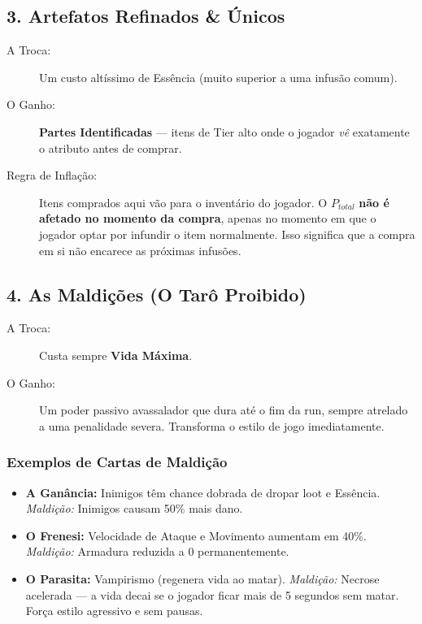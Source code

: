 \documentclass[a4paper,12pt]{report}
\begin{document}
\subsection{3. Artefatos Refinados \& Únicos}
\begin{description}
    \item[A Troca:] Um custo altíssimo de Essência (muito superior a uma infusão comum).
    \item[O Ganho:] \textbf{Partes Identificadas} — itens de Tier alto onde o jogador \textit{vê} exatamente o atributo antes de comprar.
    \item[Regra de Inflação:] Itens comprados aqui vão para o inventário do jogador. O $P_{total}$ \textbf{não é afetado no momento da compra}, apenas no momento em que o jogador optar por infundir o item normalmente. Isso significa que a compra em si não encarece as próximas infusões.
\end{description}

\subsection{4. As Maldições (O Tarô Proibido)}
\begin{description}
    \item[A Troca:] Custa sempre \textbf{Vida Máxima}.
    \item[O Ganho:] Um poder passivo avassalador que dura até o fim da run, sempre atrelado a uma penalidade severa. Transforma o estilo de jogo imediatamente.
\end{description}

\subsubsection{Exemplos de Cartas de Maldição}
\begin{itemize}
    \item \textbf{A Ganância:} Inimigos têm chance dobrada de dropar loot e Essência. \textit{Maldição:} Inimigos causam 50\% mais dano.
    \item \textbf{O Frenesi:} Velocidade de Ataque e Movimento aumentam em 40\%. \textit{Maldição:} Armadura reduzida a 0 permanentemente.
    \item \textbf{O Parasita:} Vampirismo (regenera vida ao matar). \textit{Maldição:} Necrose acelerada — a vida decai se o jogador ficar mais de 5 segundos sem matar. Força estilo agressivo e sem pausas.
\end{itemize}
\end{document}

